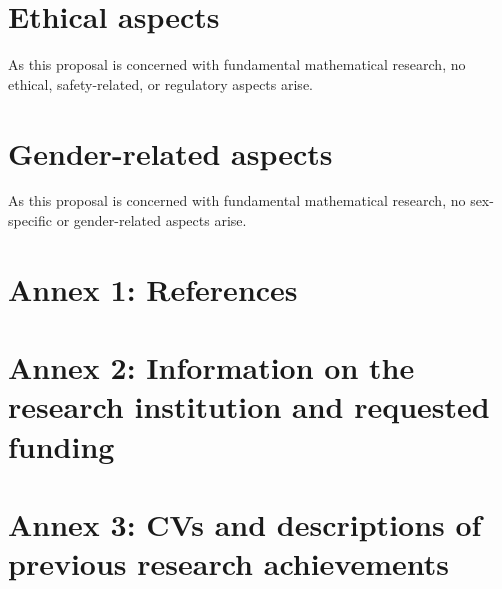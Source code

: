 \documentclass[a4paper,11pt]{scrartcl}
\begin{document}
\section{Ethical aspects}\label{sec:ethics}

As this proposal is concerned with fundamental mathematical research, no ethical, safety-related, or regulatory aspects arise.

\section{Gender-related aspects}\label{sec:gender}

As this proposal is concerned with fundamental mathematical research, no sex-specific or gender-related aspects arise.


\newpage
\section*{Annex 1: References}

\printbibliography[heading=none]

\newpage
\section*{Annex 2: Information on the research institution and requested funding}

\newpage
\section*{Annex 3: CVs and descriptions of previous research achievements}
\end{document}
